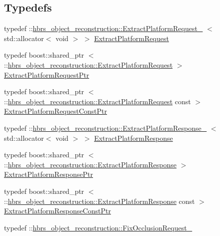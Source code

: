 \subsection*{\-Typedefs}
\begin{DoxyCompactItemize}
\item 
typedef \*
\-::\hyperlink{structhbrs__object__reconstruction_1_1_extract_platform_request__}{hbrs\-\_\-object\-\_\-reconstruction\-::\-Extract\-Platform\-Request\-\_\-}\*
$<$ std\-::allocator$<$ void $>$ $>$ \hyperlink{namespacehbrs__object__reconstruction_a41ceceb45876d46f34df4d565d3b4e66}{\-Extract\-Platform\-Request}
\item 
typedef boost\-::shared\-\_\-ptr\*
$<$ \-::\hyperlink{namespacehbrs__object__reconstruction_a41ceceb45876d46f34df4d565d3b4e66}{hbrs\-\_\-object\-\_\-reconstruction\-::\-Extract\-Platform\-Request} $>$ \hyperlink{namespacehbrs__object__reconstruction_afc16273e7559a8602e4fc645c734dd9b}{\-Extract\-Platform\-Request\-Ptr}
\item 
typedef boost\-::shared\-\_\-ptr\*
$<$ \-::\hyperlink{namespacehbrs__object__reconstruction_a41ceceb45876d46f34df4d565d3b4e66}{hbrs\-\_\-object\-\_\-reconstruction\-::\-Extract\-Platform\-Request} \*
const  $>$ \hyperlink{namespacehbrs__object__reconstruction_a5acafbaed77308b73b7cce500804d356}{\-Extract\-Platform\-Request\-Const\-Ptr}
\item 
typedef \*
\-::\hyperlink{structhbrs__object__reconstruction_1_1_extract_platform_response__}{hbrs\-\_\-object\-\_\-reconstruction\-::\-Extract\-Platform\-Response\-\_\-}\*
$<$ std\-::allocator$<$ void $>$ $>$ \hyperlink{namespacehbrs__object__reconstruction_ac3d2f621d6e4ff937ecd7c90e7e69104}{\-Extract\-Platform\-Response}
\item 
typedef boost\-::shared\-\_\-ptr\*
$<$ \-::\hyperlink{namespacehbrs__object__reconstruction_ac3d2f621d6e4ff937ecd7c90e7e69104}{hbrs\-\_\-object\-\_\-reconstruction\-::\-Extract\-Platform\-Response} $>$ \hyperlink{namespacehbrs__object__reconstruction_a63aca71c236e9ab28d0e3ac5156851d7}{\-Extract\-Platform\-Response\-Ptr}
\item 
typedef boost\-::shared\-\_\-ptr\*
$<$ \-::\hyperlink{namespacehbrs__object__reconstruction_ac3d2f621d6e4ff937ecd7c90e7e69104}{hbrs\-\_\-object\-\_\-reconstruction\-::\-Extract\-Platform\-Response} \*
const  $>$ \hyperlink{namespacehbrs__object__reconstruction_aad13ee211a0d7af9cfa513261e409b70}{\-Extract\-Platform\-Response\-Const\-Ptr}
\item 
typedef \*
\-::\hyperlink{structhbrs__object__reconstruction_1_1_fix_occlusion_request__}{hbrs\-\_\-object\-\_\-reconstruction\-::\-Fix\-Occlusion\-Request\-\_\-}\*

\end{DoxyCompactItemize}
